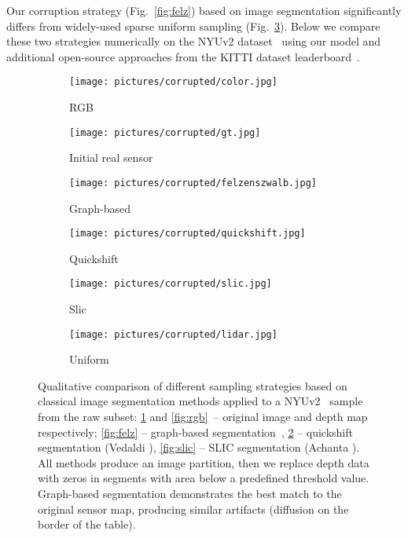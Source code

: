 \documentclass[final]{cvpr}
\begin{document}
    Our corruption strategy (Fig.~\ref{fig:felz}) based on image segmentation significantly differs from widely-used sparse uniform sampling (Fig.~\ref{fig:lidar}). Below we compare these two strategies numerically on the NYUv2 dataset~\cite{nyuv2} using our model and additional open-source approaches from the KITTI dataset leaderboard~\cite{uhrig}. 
    
    \begin{figure}[t]
      \centering
      \begin{subfigure}[b]{0.32\linewidth}
        \centering
        \texttt{[image: pictures/corrupted/color.jpg]}
        \caption{RGB}
        \label{fig:rgb}
        \centering
        \texttt{[image: pictures/corrupted/gt.jpg]}
        \caption{Initial real sensor}
        \label{fig:gt}
      \end{subfigure}
      \begin{subfigure}[b]{0.32\linewidth}
        \centering
        \texttt{[image: pictures/corrupted/felzenszwalb.jpg]}
        \caption{Graph-based \cite{felzenszwalb}}
        \label{fig:felz}
        \centering
        \texttt{[image: pictures/corrupted/quickshift.jpg]}
        \caption{Quickshift \cite{quickshift}}
        \label{fig:quickshift}
      \end{subfigure}
      \begin{subfigure}[b]{0.32\linewidth}
        \centering
        \texttt{[image: pictures/corrupted/slic.jpg]}
        \caption{Slic \cite{slic}}
        \label{fig:slic}
        \centering
        \texttt{[image: pictures/corrupted/lidar.jpg]}
        \caption{Uniform \cite{Ma2017SparseToDense}}
        \label{fig:lidar}
      \end{subfigure}
      \caption{Qualitative comparison of different sampling strategies based on classical image segmentation methods applied to a NYUv2~\cite{nyuv2} sample from the raw subset:
      \ref{fig:gt} and \ref{fig:rgb}~-- original image and depth map respectively;
      \ref{fig:felz} -- graph-based segmentation~\cite{felzenszwalb},
\ref{fig:quickshift} -- quickshift segmentation (Vedaldi \etal \cite{quickshift}), \ref{fig:slic} -- SLIC segmentation (Achanta \etal \cite{slic}). All methods produce an image partition, then we replace depth data with zeros in segments with area below a predefined threshold value. Graph-based segmentation demonstrates the best match to the original sensor map, producing similar artifacts (\eg diffusion on the border of the table).}
      \label{fig:corrupt}
    \end{figure}
    
\end{document}
